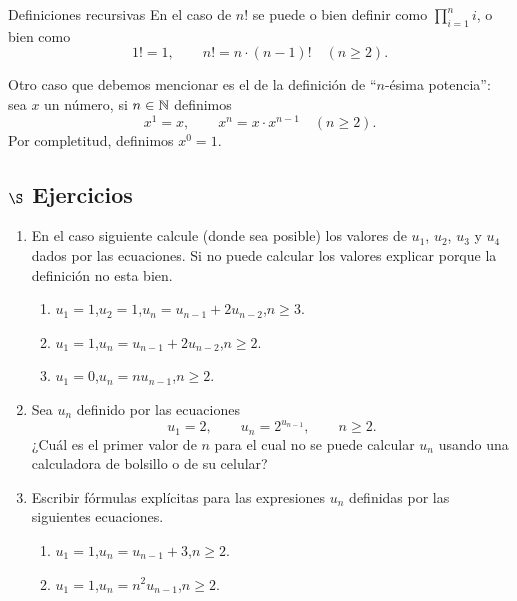 \begin{section}{Definiciones recursivas}
En  el caso de $n!$ se puede  o bien definir como $\prod_{i=1}^{n} i$, o bien como
$$
1!=1,\qquad n!=n \cdot (n-1)! \quad (n\ge 2).
$$

Otro caso que debemos mencionar es  el de la definición de ``$n$-ésima potencia'': sea $x$ un  número, si $n \in {\mathbb N}$ definimos
$$
x^1=x,\qquad x^n= x \cdot x^{n-1} \quad (n\ge 2).
$$
Por completitud,  definimos $x^0=1$. 


\subsection*{\Large $\S$ Ejercicios}
\begin{enumerate}
\item En el caso siguiente calcule (donde sea posible) los
valores de $u_1$, $u_2$, $u_3$ y $u_4$ dados por las ecuaciones.
Si no puede calcular los valores explicar porque la definición no
esta bien.
\begin{enumerate}
\item $u_1 = 1$,\qquad $u_2=1$,\qquad $u_n = u_{n-1} +2 u_{n-2}$,\qquad $n \ge 3$. 
\item $u_1 = 1$,\qquad $u_n = u_{n-1} +2u_{n-2}$,\qquad $n \ge 2$. 
\item $u_1 = 0$,\qquad $u_n = nu_{n-1}$,\qquad $n \ge 2$.
\end{enumerate}
\item Sea $u_n$ definido por las ecuaciones
$$
u_1=2,\qquad u_n= 2^{u_{n-1}}, \qquad n\ge 2.
$$
¿Cuál es el primer valor de $n$ para el cual no se puede calcular
$u_n$ usando una calculadora de bolsillo o de su celular?
\item Escribir fórmulas explícitas para las expresiones $u_n$
definidas por las siguientes ecuaciones.
\begin{enumerate}
\item $u_1 = 1$,\qquad $u_n = u_{n-1} +3$,\qquad $n \ge 2$. 
\item $u_1 = 1$,\qquad $u_n = n^2u_{n-1}$,\qquad $n \ge 2$.
\end{enumerate}
\end{enumerate}
\end{section}


